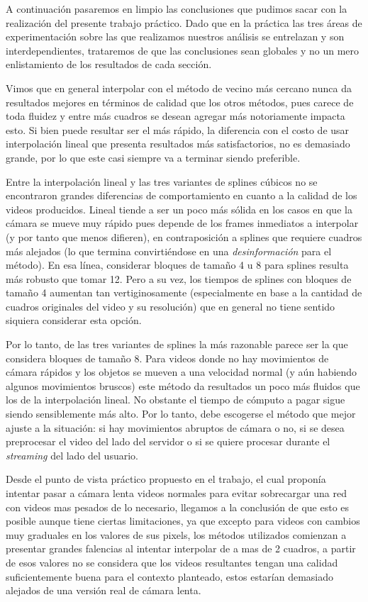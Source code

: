 A continuación pasaremos en limpio las conclusiones que pudimos sacar con la realización del presente trabajo práctico. Dado que en la práctica las tres áreas de experimentación sobre las que realizamos nuestros análisis se entrelazan y son interdependientes, trataremos de que las conclusiones sean globales y no un mero enlistamiento de los resultados de cada sección. 

Vimos que en general interpolar con el método de vecino más cercano nunca da resultados mejores en términos de calidad que los otros métodos, pues carece de toda fluidez y entre más cuadros se desean agregar más notoriamente impacta esto. Si bien puede resultar ser el más rápido, la diferencia con el costo de usar interpolación lineal que presenta resultados más satisfactorios, no es demasiado grande, por lo que este casi siempre va a terminar siendo preferible. 

Entre la interpolación lineal y las tres variantes de splines cúbicos no se encontraron grandes diferencias de comportamiento en cuanto a la calidad de los videos producidos. Lineal tiende a ser un poco más sólida en los casos en que la cámara se mueve muy rápido pues depende de los frames inmediatos a interpolar (y por tanto que menos difieren), en contraposición a splines que requiere cuadros más alejados (lo que termina convirtiéndose en una \emph{desinformación} para el método). En esa línea, considerar bloques de tamaño 4 u 8 para splines resulta más robusto que tomar 12. Pero a su vez, los tiempos de splines con bloques de tamaño 4 aumentan tan vertiginosamente (especialmente en base a la cantidad de cuadros originales del video y su resolución) que en general no tiene sentido siquiera considerar esta opción.

Por lo tanto, de las tres variantes de splines la más razonable parece ser la que considera bloques de tamaño 8. Para videos donde no hay movimientos de cámara rápidos y los objetos se mueven a una velocidad normal (y aún habiendo algunos movimientos bruscos) este método da resultados un poco más fluidos que los de la interpolación lineal. No obstante el tiempo de cómputo a pagar sigue siendo sensiblemente más alto. Por lo tanto, debe escogerse el método que mejor ajuste a la situación: si hay movimientos abruptos de cámara o no, si se desea preprocesar el video del lado del servidor o si se quiere procesar durante el \textit{streaming} del lado del usuario.

Desde el punto de vista práctico propuesto en el trabajo, el cual proponía intentar pasar a cámara lenta videos normales para evitar sobrecargar una red con videos mas pesados de lo necesario, llegamos a la conclusión de que esto es posible aunque tiene ciertas limitaciones, ya que excepto para videos con cambios muy graduales en los valores de sus pixels, los métodos utilizados comienzan a presentar grandes falencias al intentar interpolar de a mas de 2 cuadros, a partir de esos valores no se considera que los videos resultantes tengan una calidad suficientemente buena para el contexto planteado, estos estarían demasiado alejados de una versión real de cámara lenta.

